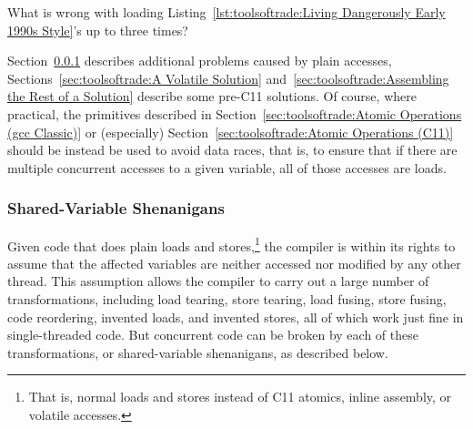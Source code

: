 \QuickQuiz{}
	What is wrong with loading
	Listing~\ref{lst:toolsoftrade:Living Dangerously Early 1990s Style}'s
	 up to three times?
 \QuickQuizEnd

Section~\ref{sec:toolsoftrade:Shared-Variable Shenanigans}
describes additional problems caused by plain accesses,
Sections~\ref{sec:toolsoftrade:A Volatile Solution}
and~\ref{sec:toolsoftrade:Assembling the Rest of a Solution}
describe some pre-C11 solutions.
Of course, where practical, the primitives described in
Section~\ref{sec:toolsoftrade:Atomic Operations (gcc Classic)}
or (especially)
Section~\ref{sec:toolsoftrade:Atomic Operations (C11)}
should be instead be used to avoid data races, that is, to ensure
that if there are multiple concurrent accesses to a given
variable, all of those accesses are loads.

\subsubsection{Shared-Variable Shenanigans}
\label{sec:toolsoftrade:Shared-Variable Shenanigans}

Given code that does plain loads and stores,\footnote{
	That is, normal loads and stores instead of C11 atomics, inline
	assembly, or volatile accesses.}
the compiler is within
its rights to assume that the affected variables are neither accessed
nor modified by any other thread.
This assumption allows the compiler to carry out a large number of
transformations, including load tearing, store tearing,
load fusing, store fusing, code reordering, invented loads, and
invented stores, all of which work just fine in single-threaded code.
But concurrent code can be broken by each of these transformations,
or shared-variable shenanigans, as described below.

